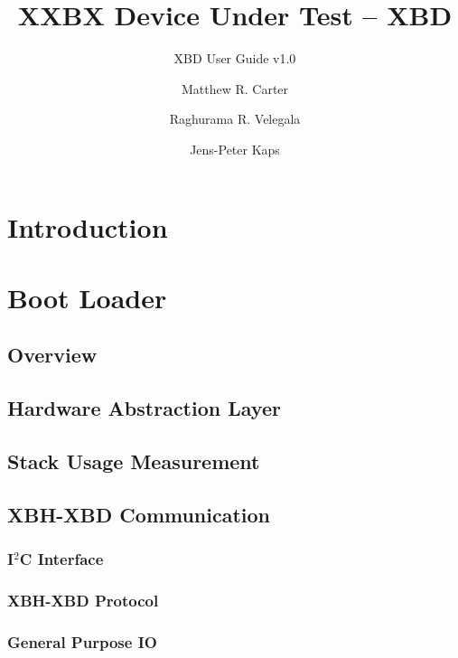 \documentclass[twoside,11pt]{cergdoc}
\begin{document}
\title{XXBX Device Under Test -- XBD}
\subtitle{XBD User Guide v1.0}
\author{Matthew R. Carter \and Raghurama R. Velegala \and Jens-Peter Kaps}

\maketitle

\tableofcontents

\chapter{Introduction}
\chapter{Boot Loader}
  \section{Overview}
  \section{Hardware Abstraction Layer}
  \section{Stack Usage Measurement}
  \section{XBH-XBD Communication}
    \subsection{I$^2$C Interface}
    \subsection{XBH-XBD Protocol}
    \subsection{General Purpose IO}
\end{document}
